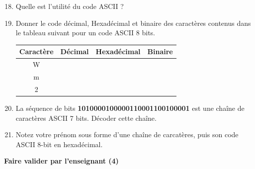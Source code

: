 \documentclass{article}
\begin{document}
\begin{enumerate}
	\setcounter{enumi}{17}
	\item Quelle est l'utilité du code ASCII ?\\
\vspace{1em}
\begin{Form}
	\TextField[name=r18,width=\linewidth,height=2.5em,multiline=true]{}
\end{Form}
	\item Donner le code décimal, Hexadécimal et binaire des caractères contenus dans le tableau suivant pour un code ASCII 8 bits.
\begin{center}
	\begin{Form}
		\begin{tabular}{|c|c|c|c|}
			\hline
			Caractère & Décimal & Hexadécimal & Binaire\\
			\hline
			\hline
			W & \TextField[name=r19d1,width=4em]{} & \TextField[name=r19h1,width=3em]{} & \TextField[name=r19b1,width=8em]{}\\
			\hline
			m & \TextField[name=r19d2,width=4em]{} & \TextField[name=r19h2,width=3em]{} & \TextField[name=r19b2,width=8em]{}\\
			\hline
			2 & \TextField[name=r19d3,width=4em]{} & \TextField[name=r19h3,width=3em]{} & \TextField[name=r19b3,width=8em]{}\\
			\hline
		\end{tabular}
	\end{Form}
\end{center}
	\item La séquence de bits \textbf{\color{red}1010000100000110001100100001} est une chaîne de caractères ASCII 7 bits.
		Décoder cette chaîne.\\
\vspace{1em}
\begin{Form}
	\TextField[name=r20,width=\linewidth,height=2.5em,multiline=true]{}
\end{Form}
	\item Notez votre prénom sous forme d'une chaîne de carcatères, puis son code ASCII 8-bit en hexadécimal.\\
\begin{Form}
	\TextField[name=r21,width=\linewidth,height=2.5em,multiline=true]{}
\end{Form}
\end{enumerate}

\begin{center}
	\vspace{2em}
	\Large
	\textbf{Faire valider par l'enseignant (4)}
\end{center}
\end{document}
